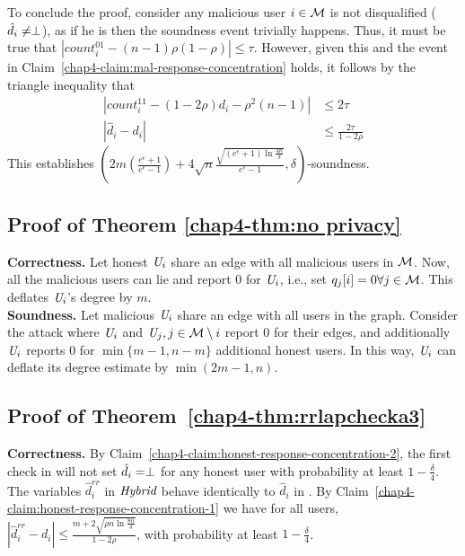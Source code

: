 To conclude the proof, consider any malicious user $i \in \mathcal{M}$ is not disqualified ($\hat{d}_i \neq \perp$),
as if he is then the soundness event trivially happens. Thus, it must be true that $|count_i^{01} - (n-1)\rho(1-\rho)| \leq \tau$. However, given this and the event in Claim~\ref{chap4-claim:mal-response-concentration} holds, it follows by the triangle inequality that
\begin{align*}
    |count_i^{11}-(1-2\rho)d_i - \rho^2(n-1)| &\leq 2 \tau \\
    |\hat{d}_i - d_i| &\leq \frac{2 \tau }{1-2\rho}
\end{align*}
This establishes $\left( 2m (\frac{e^\epsilon+1}{e^{\epsilon}-1}) + 4\sqrt{n}\frac{ \sqrt{(e^\epsilon+1)\ln \frac{4n}{\delta}}}{e^\epsilon-1}, \delta\right)$-soundness.

\subsection{Proof of Theorem \ref{chap4-thm:no privacy}}\label{chap4-app:thm:no privacy}
\textbf{Correctness.}
Let honest $\textit{U}_i$ share an edge with all malicious users in $\mathcal{M}$. Now, all the malicious users can lie and report $0$ for $\textit{U}_i$, i.e., set $q_j[i]=0 \forall j \in \mathcal{M}$. This deflates $\textit{U}_i$'s degree by $m$.
\\
\noindent \textbf{Soundness.} Let malicious $\textit{U}_i$ share an edge with all users in the graph. Consider the attack where $\textit{U}_i$ and $\textit{U}_j, j \in \mathcal{M} \setminus i$ report $0$ for their edges, and additionally $\textit{U}_i$ reports $0$ for $\min\{m-1, n-m\}$ additional honest users. In this way, $\textit{U}_i$ can deflate its degree estimate by $\min(2m-1,n)$.

\subsection{Proof of Theorem~\ref{chap4-thm:rrlapchecka3}}
\textbf{Correctness.}\label{chap4-app:thm:rrlapchecka3}
By Claim~\ref{chap4-claim:honest-response-concentration-2}, the first check in \DegHybrid{} will not set $\hat{d}_i = \perp$ for any honest user with probability at least $1-\frac{\delta}{4}$. 
The variables $\hat{d}_i^{rr}$ in $\textit{Hybrid}$ behave identically to $\hat{d}_i$ in \DegRRCheck{}. By Claim~\ref{chap4-claim:honest-response-concentration-1} 
we have for all users, $|\hat{d}_i^{rr} - d_i| \leq \frac{m + 2 \sqrt{\rho n \ln \frac{8n}{\delta}}}{1-2\rho}$,
with probability at least $1-\frac{\delta}{4}$. 


